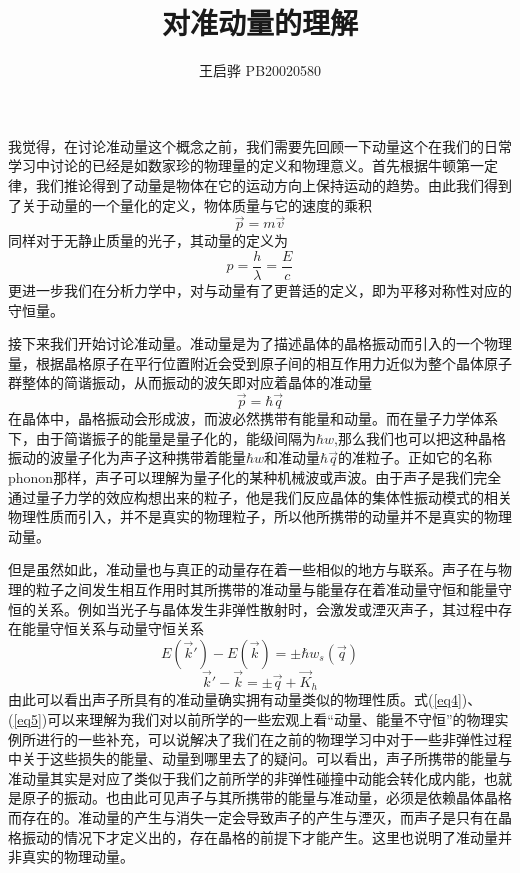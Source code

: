 \documentclass{article}
\title{\songti \zihao{2}\bfseries 对准动量的理解}
\author{王启骅 PB20020580}
\begin{document}
	\maketitle
	我觉得，在讨论准动量这个概念之前，我们需要先回顾一下动量这个在我们的日常学习中讨论的已经是如数家珍的物理量的定义和物理意义。首先根据牛顿第一定律，我们推论得到了动量是物体在它的运动方向上保持运动的趋势。由此我们得到了关于动量的一个量化的定义，物体质量与它的速度的乘积
	\begin{equation}
		\vec{p}=m\vec{v}
	\end{equation}
同样对于无静止质量的光子，其动量的定义为
\begin{equation}
	p=\frac{h}{\lambda}=\frac{E}{c}
\end{equation}
更进一步我们在分析力学中，对与动量有了更普适的定义，即为平移对称性对应的守恒量。


接下来我们开始讨论准动量。准动量是为了描述晶体的晶格振动而引入的一个物理量，根据晶格原子在平行位置附近会受到原子间的相互作用力近似为整个晶体原子群整体的简谐振动，从而振动的波矢即对应着晶体的准动量
\begin{equation}
	\vec{p}=\hbar\vec{q}
\end{equation}
在晶体中，晶格振动会形成波，而波必然携带有能量和动量。而在量子力学体系下，由于简谐振子的能量是量子化的，能级间隔为$ \hbar w $,那么我们也可以把这种晶格振动的波量子化为声子这种携带着能量$ \hbar w $和准动量$ \hbar\vec{q} $的准粒子。正如它的名称phonon那样，声子可以理解为量子化的某种机械波或声波。由于声子是我们完全通过量子力学的效应构想出来的粒子，他是我们反应晶体的集体性振动模式的相关物理性质而引入，并不是真实的物理粒子，所以他所携带的动量并不是真实的物理动量。


但是虽然如此，准动量也与真正的动量存在着一些相似的地方与联系。声子在与物理的粒子之间发生相互作用时其所携带的准动量与能量存在着准动量守恒和能量守恒的关系。例如当光子与晶体发生非弹性散射时，会激发或湮灭声子，其过程中存在能量守恒关系与动量守恒关系
\begin{equation}
	E(\vec{k}')-E(\vec{k})=\pm\hbar w_s(\vec{q})
	\label{eq4}
\end{equation}
\begin{equation}
	\vec{k}'-\vec{k}=\pm \vec{q}+\vec{K}_h
	\label{eq5}
\end{equation}
由此可以看出声子所具有的准动量确实拥有动量类似的物理性质。式(\ref{eq4})、(\ref{eq5})可以来理解为我们对以前所学的一些宏观上看“动量、能量不守恒”的物理实例所进行的一些补充，可以说解决了我们在之前的物理学习中对于一些非弹性过程中关于这些损失的能量、动量到哪里去了的疑问。可以看出，声子所携带的能量与准动量其实是对应了类似于我们之前所学的非弹性碰撞中动能会转化成内能，也就是原子的振动。也由此可见声子与其所携带的能量与准动量，必须是依赖晶体晶格而存在的。准动量的产生与消失一定会导致声子的产生与湮灭，而声子是只有在晶格振动的情况下才定义出的，存在晶格的前提下才能产生。这里也说明了准动量并非真实的物理动量。
\end{document}
